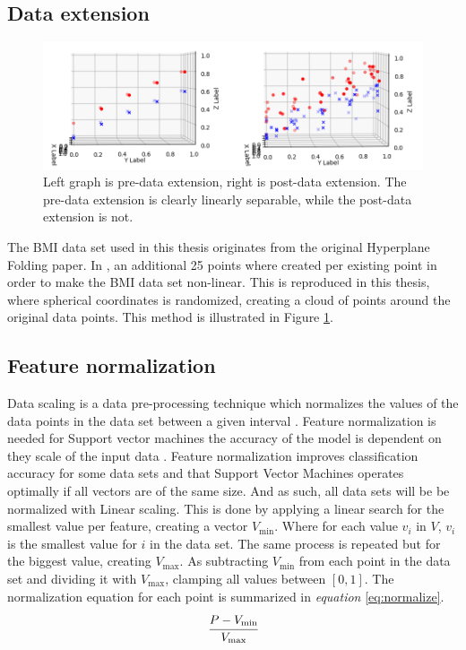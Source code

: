 \documentclass[a4paper,twoside]{bth}
\begin{document}
\subsection{Data extension}
\begin{figure}
\centering
\includegraphics[scale=0.75]{images/metod-images/extend.png}
   \caption{Left graph is pre-data extension, right is post-data extension. The pre-data extension is clearly linearly separable, while the post-data extension is not. }
   \label{fig:extend}
\end{figure}

The BMI data set used in this thesis originates from the original Hyperplane Folding paper. In \cite{unpublished}, an additional 25 points where created per existing point in order to make the BMI data set non-linear. This is reproduced in this thesis, where spherical coordinates is randomized, creating a cloud of points around the original data points. This method is illustrated in Figure \ref{fig:extend}.



\subsection{Feature normalization}
Data scaling is a data pre-processing technique which normalizes the values of the data points in the data set between a given interval \cite{featurescaling-org}. Feature normalization is needed for Support vector machines the accuracy of the model is dependent on they scale of the input data \cite{featurescaling-svm}. Feature normalization improves classification accuracy for some data sets \cite{featurescaling-br} and that Support Vector Machines operates optimally if all vectors are of the same size\cite{1077809}. And as such, all data sets will be be normalized with Linear scaling. This is done by applying a linear search for the smallest value per feature, creating a vector $V_{\text{min}}$. Where for each value $v_i$ in $V$, $v_i$ is the smallest value for $i$ in the data set. The same process is repeated but for the biggest value, creating $V_{\text{max}}$. As subtracting $V_{\text{min}}$ from each point in the data set and dividing it with $V_{\text{max}}$, clamping all values between $[0,1]$. The normalization equation for each point is summarized in \textit{equation} \ref{eq:normalize}. 
\begin{equation}\label{eq:normalize}
\begin{aligned}
     \cfrac{P - V_{\text{min}}}{{V_\text{max}}}
\end{aligned}
\end{equation} 
\end{document}

